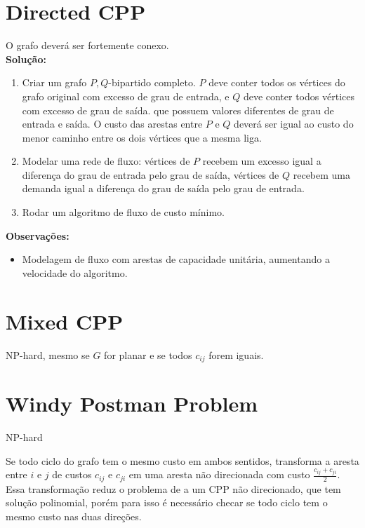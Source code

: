 \documentclass{article}
\begin{document}
\section{Directed CPP}

	O grafo deverá ser fortemente conexo.\\


	\textbf{Solução:}
	\begin{enumerate}
		\item Criar um grafo $P, Q$-bipartido completo. $P$ deve conter todos os vértices do grafo original com excesso de grau de entrada, e $Q$ deve conter todos vértices com excesso de grau de saída. que possuem valores diferentes de grau de entrada e saída. O custo das arestas entre $P$ e $Q$ deverá ser igual ao custo do menor caminho entre os dois vértices que a mesma liga.
		\item Modelar uma rede de fluxo: vértices de $P$ recebem um excesso igual a diferença do grau de entrada pelo grau de saída, vértices de $Q$ recebem uma demanda igual a diferença do grau de saída pelo grau de entrada. 
		\item Rodar um algoritmo de fluxo de custo mínimo. 
	\end{enumerate}

	\textbf{Observações:}
	\begin{itemize}
		\item Modelagem de fluxo com arestas de capacidade unitária, aumentando a velocidade do algoritmo.
	\end{itemize}

        \section{Mixed CPP}

	NP-hard, mesmo se $G$ for planar e se todos $c_{ij}$ forem iguais.

	\section{Windy Postman Problem}

	NP-hard

	Se todo ciclo do grafo tem o mesmo custo em ambos sentidos, transforma a aresta entre $i$ e $j$ de custos $c_{ij}$ e $c_{ji}$ em uma aresta não direcionada com custo $\frac{c_{ij} + c_{ji}}{2}$. Essa transformação reduz o problema de a um CPP não direcionado, que tem solução polinomial, porém para isso é necessário checar se todo ciclo tem o mesmo custo nas duas direções.
\end{document}
